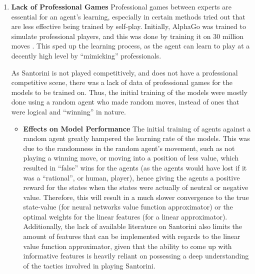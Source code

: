\documentclass[a4paper,12pt,table]{article}
\begin{document}
\begin{enumerate}
\begin{itemize}
    \end{itemize}

    \item \textbf{Lack of Professional Games}
    \newline
    Professional games between experts are essential for an agent’s learning, especially in certain methods tried out that are less effective being trained by self-play. Initially, AlphaGo was trained to simulate professional players, and this was done by training it on 30 million moves \cite{Mastering the game of Go with deep neural networks and tree search}. This sped up the learning process, as the agent can learn to play at a decently high level by “mimicking” professionals.   \par

    As Santorini is not played competitively, and does not have a professional competitive scene, there was a lack of data of professional games for the models to be trained on. Thus, the initial training of the models were mostly done using a random agent who made random moves, instead of ones that were logical and “winning” in nature.
    
    \begin{itemize}
        \item \textbf{Effects on Model Performance}
        \newline
        The initial training of agents against a random agent greatly hampered the learning rate of the models. This was due to the randomness in the random agent’s movement, such as not playing a winning move, or moving into a position of less value, which resulted in “false” wins for the agents (as the agents would have lost if it was a “rational”, or human, player), hence giving the agents a positive reward for the states when the states were actually of neutral or negative value. Therefore, this will result in a much slower convergence to the true state-value (for neural networks value function approximator) or the optimal weights for the linear features (for a linear approximator). \\

        Additionally, the lack of available literature on Santorini also limits the amount of features that can be implemented with regards to the linear value function approximator, given that the ability to come up with informative features is heavily reliant on possessing a deep understanding of the tactics involved in playing Santorini.\\
    \newline
    \newline
    \end{itemize}
   

\end{enumerate}
\end{document}
